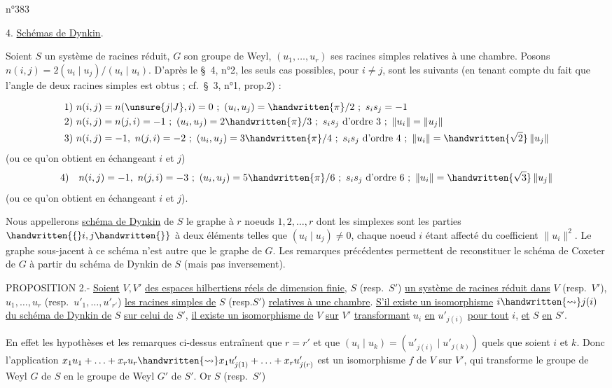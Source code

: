 \hfill n°383

4. \uline{Schémas de Dynkin}.

Soient $S$ un système de racines réduit, $G$ son groupe de Weyl, $(u_1,\ldots,u_r)$ ses racines simples relatives à une chambre. Posons $n(i,j)=2(u_i\mid u_j)/(u_i\mid u_i)$. D'après le \S~4, n°2, les seuls cas possibles, pour $i\ne j$, sont les suivants (en tenant compte du fait que l'angle de deux racines simples est obtus ; cf.\ \S~3, n°1, prop.2) :

\[
\begin{aligned}
1)\ & n(i,j)=n(\unsure{j|J},i)=0\ ;\ (u_i,u_j)=\handwritten{\pi}/2\ ;\ s_i s_j=-1\\
2)\ & n(i,j)=n(j,i)=-1\ ;\ (u_i,u_j)=2\handwritten{\pi}/3\ ;\ s_i s_j\ \text{d'ordre }3\ ;\ \|u_i\|=\|u_j\|\\
3)\ & n(i,j)=-1,\ n(j,i)=-2\ ;\ (u_i,u_j)=3\handwritten{\pi}/4\ ;\ s_i s_j\ \text{d'ordre }4\ ;\ \|u_i\|=\handwritten{\sqrt{2}}\,\|u_j\|
\end{aligned}
\]
(ou ce qu'on obtient en échangeant $i$ et $j$)
\[
4)\quad n(i,j)=-1,\ n(j,i)=-3\ ;\ (u_i,u_j)=5\handwritten{\pi}/6\ ;\ s_i s_j\ \text{d'ordre }6\ ;\ \|u_i\|=\handwritten{\sqrt{3}}\,\|u_j\|
\]
(ou ce qu'on obtient en échangeant $i$ et $j$).

Nous appellerons \uline{schéma de Dynkin} de $S$ le graphe à $r$ noeuds $1,2,\ldots,r$ dont les simplexes sont les parties $\handwritten{\{}i,j\handwritten{\}}$ à deux éléments telles que $(u_i\mid u_j)\ne0$, chaque noeud $i$ étant affecté du coefficient $\|u_i\|^2$. Le graphe sous-jacent à ce schéma n'est autre que le graphe de $G$. Les remarques précédentes permettent de reconstituer le schéma de Coxeter de $G$ à partir du schéma de Dynkin de $S$ (mais pas inversement).

PROPOSITION 2.- \uline{Soient} $V,V'$ \uline{des espaces hilbertiens réels de dimension finie}, $S$ (resp.\ $S'$) \uline{un système de racines réduit dans} $V$ (resp.\ $V'$), $u_1,\ldots,u_r$ (resp.\ $u'_1,\ldots,u'_{r'}$) \uline{les racines simples de} $S$ (resp.$S'$) \uline{relatives à une chambre}. \uline{S'il existe un isomorphisme} $i\handwritten{\rightsquigarrow}j(i)$ \uline{du schéma de Dynkin de} $S$ \uline{sur celui de} $S'$, \uline{il existe un isomorphisme de} $V$ \uline{sur} $V'$ \uline{transformant} $u_i$ \uline{en} $u'_{j(i)}$ \uline{pour tout} $i$, \uline{et} $S$ \uline{en} $S'$.

En effet les hypothèses et les remarques ci-dessus entraînent que $r=r'$ et que $(u_i\mid u_k)=(u'_{j(i)}\mid u'_{j(k)})$ quels que soient $i$ et $k$. Donc l'application $x_1u_1+\ldots+x_ru_r\handwritten{\rightsquigarrow}x_1u'_{j(1)}+\ldots+x_ru'_{j(r)}$ est un isomorphisme $f$ de $V$ sur $V'$, qui transforme le groupe de Weyl $G$ de $S$ en le groupe de Weyl $G'$ de $S'$. Or $S$ (resp.\ $S'$)
